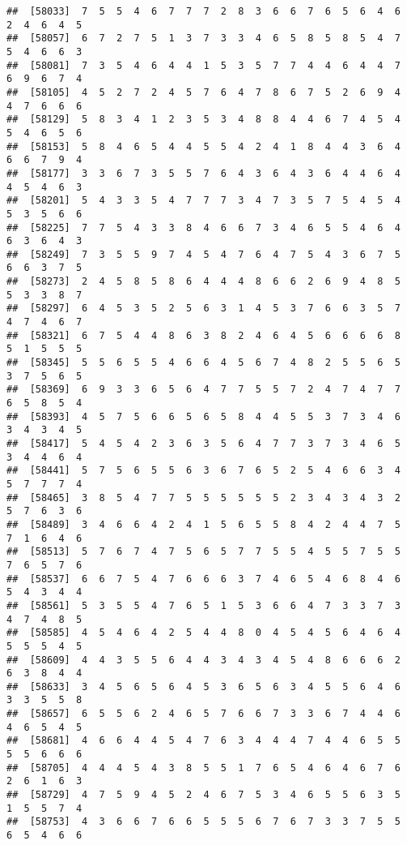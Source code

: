 \documentclass[
]{book}
\begin{document}
\begin{verbatim}
##  [58033]  7  5  5  4  6  7  7  7  2  8  3  6  6  7  6  5  6  4  6  2  4  6  4  5
##  [58057]  6  7  2  7  5  1  3  7  3  3  4  6  5  8  5  8  5  4  7  5  4  6  6  3
##  [58081]  7  3  5  4  6  4  4  1  5  3  5  7  7  4  4  6  4  4  7  6  9  6  7  4
##  [58105]  4  5  2  7  2  4  5  7  6  4  7  8  6  7  5  2  6  9  4  4  7  6  6  6
##  [58129]  5  8  3  4  1  2  3  5  3  4  8  8  4  4  6  7  4  5  4  5  4  6  5  6
##  [58153]  5  8  4  6  5  4  4  5  5  4  2  4  1  8  4  4  3  6  4  6  6  7  9  4
##  [58177]  3  3  6  7  3  5  5  7  6  4  3  6  4  3  6  4  4  6  4  4  5  4  6  3
##  [58201]  5  4  3  3  5  4  7  7  7  3  4  7  3  5  7  5  4  5  4  5  3  5  6  6
##  [58225]  7  7  5  4  3  3  8  4  6  6  7  3  4  6  5  5  4  6  4  6  3  6  4  3
##  [58249]  7  3  5  5  9  7  4  5  4  7  6  4  7  5  4  3  6  7  5  6  6  3  7  5
##  [58273]  2  4  5  8  5  8  6  4  4  4  8  6  6  2  6  9  4  8  5  5  3  3  8  7
##  [58297]  6  4  5  3  5  2  5  6  3  1  4  5  3  7  6  6  3  5  7  4  7  4  6  7
##  [58321]  6  7  5  4  4  8  6  3  8  2  4  6  4  5  6  6  6  6  8  5  1  5  5  5
##  [58345]  5  5  6  5  5  4  6  6  4  5  6  7  4  8  2  5  5  6  5  3  7  5  6  5
##  [58369]  6  9  3  3  6  5  6  4  7  7  5  5  7  2  4  7  4  7  7  6  5  8  5  4
##  [58393]  4  5  7  5  6  6  5  6  5  8  4  4  5  5  3  7  3  4  6  3  4  3  4  5
##  [58417]  5  4  5  4  2  3  6  3  5  6  4  7  7  3  7  3  4  6  5  3  4  4  6  4
##  [58441]  5  7  5  6  5  5  6  3  6  7  6  5  2  5  4  6  6  3  4  5  7  7  7  4
##  [58465]  3  8  5  4  7  7  5  5  5  5  5  5  2  3  4  3  4  3  2  5  7  6  3  6
##  [58489]  3  4  6  6  4  2  4  1  5  6  5  5  8  4  2  4  4  7  5  7  1  6  4  6
##  [58513]  5  7  6  7  4  7  5  6  5  7  7  5  5  4  5  5  7  5  5  7  6  5  7  6
##  [58537]  6  6  7  5  4  7  6  6  6  3  7  4  6  5  4  6  8  4  6  5  4  3  4  4
##  [58561]  5  3  5  5  4  7  6  5  1  5  3  6  6  4  7  3  3  7  3  4  7  4  8  5
##  [58585]  4  5  4  6  4  2  5  4  4  8  0  4  5  4  5  6  4  6  4  5  5  5  4  5
##  [58609]  4  4  3  5  5  6  4  4  3  4  3  4  5  4  8  6  6  6  2  6  3  8  4  4
##  [58633]  3  4  5  6  5  6  4  5  3  6  5  6  3  4  5  5  6  4  6  3  3  5  5  8
##  [58657]  6  5  5  6  2  4  6  5  7  6  6  7  3  3  6  7  4  4  6  4  6  5  4  5
##  [58681]  4  6  6  4  4  5  4  7  6  3  4  4  4  7  4  4  6  5  5  5  5  6  6  6
##  [58705]  4  4  4  5  4  3  8  5  5  1  7  6  5  4  6  4  6  7  6  2  6  1  6  3
##  [58729]  4  7  5  9  4  5  2  4  6  7  5  3  4  6  5  5  6  3  5  1  5  5  7  4
##  [58753]  4  3  6  6  7  6  6  5  5  5  6  7  6  7  3  3  7  5  5  6  5  4  6  6

\end{verbatim}
\end{document}
